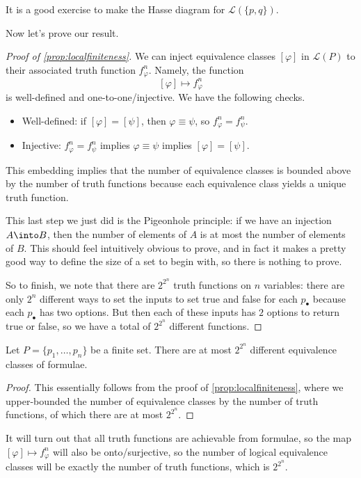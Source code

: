 It is a good exercise to make the Hasse diagram for $\mathcal L(\{p,q\})$.

Now let's prove our result.
\begin{proof}[Proof of \autoref{prop:localfiniteness}]
	We can inject equivalence classes $[\varphi]$ in $\mathcal L(P)$ to their associated truth function $f_\varphi^n$. Namely, the function
	\[[\varphi]\mapsto f_\varphi^n\]
	is well-defined and one-to-one/injective. We have the following checks.
	\begin{itemize}
		\item Well-defined: if $[\varphi]=[\psi]$, then $\varphi\equiv\psi$, so $f_\varphi^n=f_\psi^n$.
		\item Injective: $f_\varphi^n=f_\psi^n$ implies $\varphi\equiv\psi$ implies $[\varphi]=[\psi]$.
	\end{itemize}
	This embedding implies that the number of equivalence classes is bounded above by the number of truth functions because each equivalence class yields a unique truth function.
	\begin{remark}
		This last step we just did is the Pigeonhole principle: if we have an injection $A\into B$, then the number of elements of $A$ is at most the number of elements of $B$. This should feel intuitively obvious to prove, and in fact it makes a pretty good way to define the size of a set to begin with, so there is nothing to prove.
	\end{remark}
	So to finish, we note that there are $2^{2^n}$ truth functions on $n$ variables: there are only $2^n$ different ways to set the inputs to set true and false for each $p_\bullet$ because each $p_\bullet$ has two options. But then each of these inputs has $2$ options to return true or false, so we have a total of $2^{2^n}$ different functions.
\end{proof}
\begin{corollary} \label{cor:countequivclasses}
	Let $P=\{p_1,\ldots,p_n\}$ be a finite set. There are at most $2^{2^n}$ different equivalence classes of formulae.
\end{corollary}
\begin{proof}
	This essentially follows from the proof of \autoref{prop:localfiniteness}, where we upper-bounded the number of equivalence classes by the number of truth functions, of which there are at most $2^{2^n}$.
\end{proof}
\begin{remark} \label{rem:completeness}
	It will turn out that all truth functions are achievable from formulae, so the map $[\varphi]\mapsto f_\varphi^n$ will also be onto/surjective, so the number of logical equivalence classes will be exactly the number of truth functions, which is $2^{2^n}$.
\end{remark}

